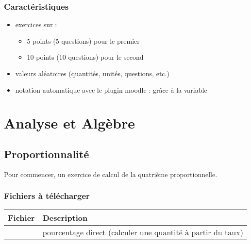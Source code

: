 \documentclass[letterpaper,10pt,french]{sphinxmanual}
\begin{document}
\subsection{Caractéristiques}
\label{\detokenize{proba stat - tirage al_xe9a:caracteristiques}}\begin{itemize}
\item {} 
exercices sur :
\begin{itemize}
\item {} 
5 points (5 questions) pour le premier

\item {} 
10 points (10 questions) pour le second

\end{itemize}

\item {} 
valeurs aléatoires (quantités, unités, questions, etc.)

\item {} 
notation automatique avec le plugin moodle : grâce à la variable 

\end{itemize}


\chapter{Analyse et Algèbre}
\label{\detokenize{index:analyse-et-algebre}}

\section{Proportionnalité}
\label{\detokenize{analyse alg_xe8bre - proportionnalit_xe9:proportionnalite}}\label{\detokenize{analyse alg_xe8bre - proportionnalit_xe9::doc}}
Pour commencer, un exercice de calcul de la quatrième proportionnelle.



\subsection{Fichiers à télécharger}
\label{\detokenize{analyse alg_xe8bre - proportionnalit_xe9:fichiers-a-telecharger}}

\begin{savenotes}\sphinxattablestart
\centering
{}
\label{\detokenize{analyse alg_xe8bre - proportionnalit_xe9:id1}}
\sphinxaftercaption
\begin{tabulary}{\linewidth}[t]{|T|T|}
\hline
\sphinxstyletheadfamily 
Fichier
&\sphinxstyletheadfamily 
Description
\\
\hline
{}
&
pourcentage direct (calculer une quantité à partir du taux)
\\
\hline
\end{tabulary}
\par
\sphinxattableend\end{savenotes}
\end{document}
